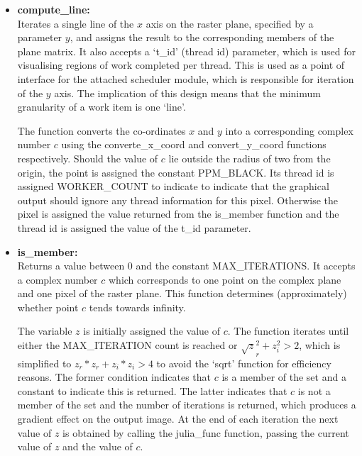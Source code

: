 \begin{itemize}
\item \textbf{compute\_line:} \\
            Iterates a single line of the \(x\) axis on the raster plane, specified by a parameter \(y\), and assigns the result to the corresponding
            members of the plane matrix.
            It also accepts a `t\_id' (thread id) parameter, which is used for visualising regions of work completed per thread.
            This is used as a point of interface for the attached scheduler module, which is responsible for iteration of the \(y\) axis. 
            The implication of this design means that the minimum granularity of a work item
            is one `line'.

            The function converts the co-ordinates \(x\) and \(y\) into a corresponding complex number \(c\) using the converte\_x\_coord and 
            convert\_y\_coord functions respectively. 
            Should the value of \(c\) lie outside the radius of two from the origin, the point is 
            assigned the constant PPM\_BLACK. Its thread id is assigned WORKER\_COUNT to indicate to indicate that the graphical output should
            ignore any thread information for this pixel.
            Otherwise the pixel is assigned the value returned from the is\_member function and the thread id is assigned the value of 
            the t\_id parameter.
            
\item \textbf{is\_member:} \\
            Returns a value between 0 and the constant MAX\_ITERATIONS. It accepts a complex number \(c\) which corresponds to one point 
            on the complex plane and one pixel of the raster plane. This function determines (approximately) whether point \(c\) tends towards
            infinity.
            
            The variable \(z\) is initially assigned the value of \(c\). The function iterates until either the MAX\_ITERATION count is reached
            or \(\sqrt z_r^2 + z_i^2 > 2\), which is simplified to \(z_r * z_r + z_i * z_i > 4\) to avoid the `sqrt' function for efficiency
            reasons. The former condition indicates that \(c\) is a member of the set and a constant to indicate this is returned. 
            The latter indicates that \(c\) is not a member of the set and the number of iterations is returned, which produces a gradient 
            effect on the output image. At the end of each iteration the next value of \(z\) is obtained by calling the julia\_func function,
            passing the current value of \(z\) and the value of \(c\).
            

\end{itemize}
